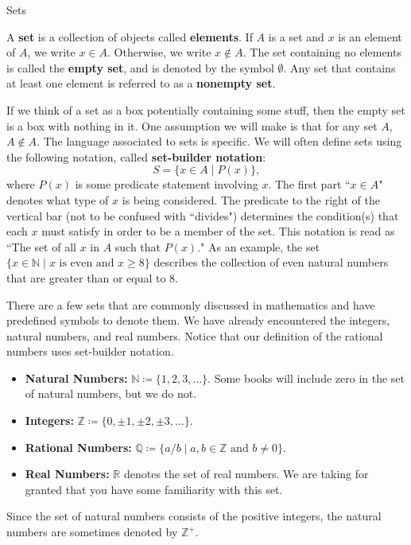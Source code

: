 \begin{section}{Sets}

\begin{definition}
A \textbf{set} is a collection of objects called \textbf{elements}. If $A$ is a set and $x$ is an element of $A$, we write $\boxed{x\in A}$. Otherwise, we write $\boxed{x\notin A}$. The set containing no elements is called the \textbf{empty set}, and is denoted by the symbol $\boxed{\emptyset}$. Any set that contains at least one element is referred to as a \textbf{nonempty set}.
\end{definition}

If we think of a set as a box potentially containing some stuff, then the empty set is a box with nothing in it. One assumption we will make is that for any set $A$, $A\notin A$. The language associated to sets is specific.  We will often define sets using the following notation, called \textbf{set-builder notation}:
\[
\boxed{S=\{x \in A\mid P(x)\}},
\]
where $P(x)$ is some predicate statement involving $x$. The first part ``$x \in A$" denotes what type of $x$ is being considered.  The predicate to the right of the vertical bar (not to be confused with ``divides") determines the condition(s) that each $x$ must satisfy in order to be a member of the set.  This notation is read as ``The set of all $x$ in $A$ such that $P(x)$." As an example, the set $\{x\in \mathbb{N}\mid x \mbox{ is even and }x\geq 8\}$ describes the collection of even natural numbers that are greater than or equal to 8.

There are a few sets that are commonly discussed in mathematics and have predefined symbols to denote them. We have already encountered the integers, natural numbers, and real numbers. Notice that our definition of the rational numbers uses set-builder notation.
\begin{itemize}
\item \textbf{Natural Numbers:} $\boxed{\mathbb{N}\coloneqq \{1,2,3,\ldots\}}$. Some books will include zero in the set of natural numbers, but we do not.
\item \textbf{Integers:} $\boxed{\mathbb{Z}\coloneqq \{0, \pm 1, \pm2, \pm 3, \ldots\}}$.
\item \textbf{Rational Numbers:} $\boxed{\mathbb{Q}\coloneqq \{a/b \mid a, b \in \mathbb{Z} \text{ and } b \neq 0\}}$.
\item \textbf{Real Numbers:} $\boxed{\mathbb{R}}$ denotes the set of real numbers. We are taking for granted that you have some familiarity with this set. 
\end{itemize}
Since the set of natural numbers consists of the positive integers, the natural numbers are sometimes denoted by $\mathbb{Z}^+$.


\end{section}
